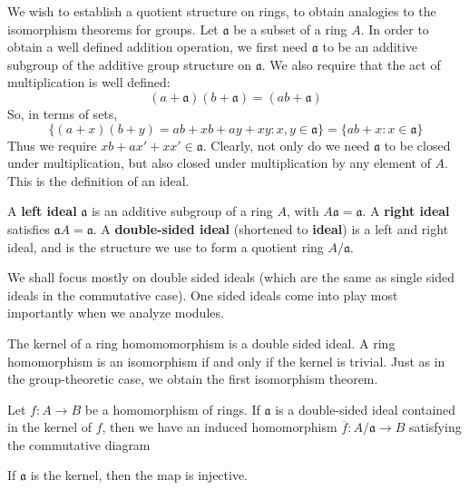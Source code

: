 We wish to establish a quotient structure on rings, to obtain analogies to the isomorphism theorems for groups. Let $\mathfrak{a}$ be a subset of a ring $A$. In order to obtain a well defined addition operation, we first need $\mathfrak{a}$ to be an additive subgroup of the additive group structure on $\mathfrak{a}$. We also require that the act of multiplication is well defined:
%
\[ (a + \mathfrak{a})(b + \mathfrak{a}) = (ab + \mathfrak{a}) \]
%
So, in terms of sets,
%
\[ \{ (a + x)(b + y) = ab + xb + ay + xy : x,y \in \mathfrak{a} \} = \{ ab + x : x \in \mathfrak{a} \} \]
%
Thus we require $xb + ax' + xx' \in \mathfrak{a}$. Clearly, not only do we need $\mathfrak{a}$ to be closed under multiplication, but also closed under multiplication by any element of $A$. This is the definition of an ideal.

\begin{definition}
    A {\bf left ideal} $\mathfrak{a}$ is an additive subgroup of a ring $A$, with $A\mathfrak{a} = \mathfrak{a}$. A {\bf right ideal} satisfies $\mathfrak{a}A = \mathfrak{a}$. A {\bf double-sided ideal} (shortened to {\bf ideal}) is a left and right ideal, and is the structure we use to form a quotient ring $A/\mathfrak{a}$.
\end{definition}

We shall focus mostly on double sided ideals (which are the same as single sided ideals in the commutative case). One sided ideals come into play most importantly when we analyze modules.

The kernel of a ring homomomorphism is a double sided ideal. A ring homomorphism is an isomorphism if and only if the kernel is trivial. Just as in the group-theoretic case, we obtain the first isomorphism theorem.

\begin{theorem}
    Let $f:A \to B$ be a homomorphism of rings. If $\mathfrak{a}$ is a double-sided ideal contained in the kernel of $f$, then we have an induced homomorphism $\overline{f}: A/\mathfrak{a} \to B$ satisfying the commutative diagram
    \begin{center}
    \end{center}
    If $\mathfrak{a}$ is the kernel, then the map is injective.
\end{theorem}

